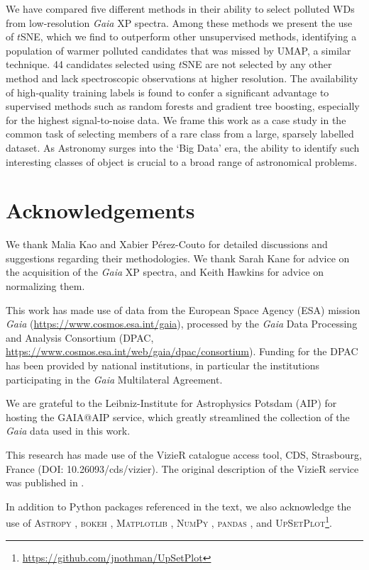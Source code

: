 \documentclass[fleqn,usenatbib]{rasti}
\begin{document}
We have compared five different methods in their ability to select polluted WDs from low-resolution \textit{Gaia} XP spectra.
Among these methods we present the use of $t$SNE, which we find to outperform other unsupervised methods, identifying a population of warmer polluted candidates that was missed by UMAP, a similar technique.
44 candidates selected using $t$SNE are not selected by any other method and lack spectroscopic observations at higher resolution.
The availability of high-quality training labels is found to confer a significant advantage to supervised methods such as random forests and gradient tree boosting, especially for the highest signal-to-noise data.
We frame this work as a case study in the common task of selecting members of a rare class from a large, sparsely labelled dataset.
As Astronomy surges into the `Big Data' era, the ability to identify such interesting classes of object is crucial to a broad range of astronomical problems.




\section*{Acknowledgements}

We thank Malia Kao and Xabier P\'erez-Couto for detailed discussions and suggestions regarding their methodologies.
We thank Sarah Kane for advice on the acquisition of the \textit{Gaia} XP spectra, and Keith Hawkins for advice on normalizing them.

This work has made use of data from the European Space Agency (ESA) mission {\it Gaia} (\url{https://www.cosmos.esa.int/gaia}), processed by the {\it Gaia} Data Processing and Analysis Consortium (DPAC, \url{https://www.cosmos.esa.int/web/gaia/dpac/consortium}). Funding for the DPAC has been provided by national institutions, in particular the institutions participating in the {\it Gaia} Multilateral Agreement.

We are grateful to the Leibniz-Institute for Astrophysics Potsdam (AIP) for hosting the GAIA@AIP service, which greatly streamlined the collection of the \textit{Gaia} data used in this work.

This research has made use of the VizieR catalogue access tool, CDS, Strasbourg, France (DOI: 10.26093/cds/vizier).
The original description of the VizieR service was published in \citet{ochsenbein00}.

In addition to Python packages referenced in the text, we also acknowledge the use of \textsc{Astropy} \citep{astropy1, astropy2, astropy3}, \textsc{bokeh} \citep{bokeh}, \textsc{Matplotlib} \citep{matplotlib}, \textsc{NumPy} \citep{numpy}, \textsc{pandas} \citep{pandas1, pandas2}, and \textsc{UpSetPlot}\footnote{\url{https://github.com/jnothman/UpSetPlot}}.
\end{document}
